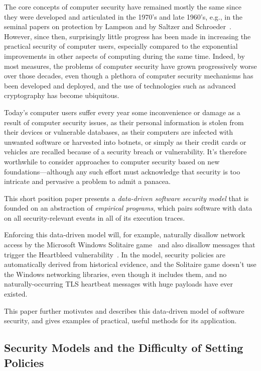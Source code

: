 \documentclass{IEEEtran}
\begin{document}
The core concepts of computer security have remained mostly the same since they were developed and articulated in the 1970’s and late 1960’s, e.g., in the seminal papers on protection by Lampson and by Saltzer and Schroeder~\cite{Protection,SaltzerAndSchroeder}.
However, since then, surprisingly little progress has been made in increasing the practical security of computer users, especially compared to the exponential improvements in other aspects of computing during the same time.
Indeed, by most measures, the problems of computer security have grown progressively worse over those decades, even though a plethora of computer security mechanisms has been developed and deployed, and the use of technologies such as advanced cryptography has become ubiquitous.


Today’s computer users suffer every year some inconvenience or damage as a result of computer security issues, as their personal information is stolen from their devices or vulnerable databases, as their computers are infected with unwanted software or harvested into botnets, or simply as their credit cards or vehicles are recalled because of a security breach or vulnerability.
It’s therefore worthwhile to consider approaches to computer security based on new foundations---although any such effort must acknowledge that security is too intricate and pervasive a problem to admit a panacea. 


This short position paper presents a \emph{data-driven software security model} that is founded on an abstraction of \emph{empirical programs}, which pairs software with data on all security-relevant events in all of its execution traces.


Enforcing this data-driven model will, for example, 
naturally
disallow network access by the Microsoft Windows Solitaire game~\cite{Solitaire}
and also disallow messages that trigger the Heartbleed vulnerability~\cite{Heartbleed}.
In the model, security policies are automatically derived from historical evidence,
and the Solitaire game doesn't use the Windows networking libraries, even though it includes them,
and no naturally-occurring TLS heartbeat messages with huge payloads have ever existed.


This  paper  further motivates  and describes this data-driven model of software security, and gives examples of practical, useful methods for its application.


\subsection{Security Models and the Difficulty of Setting Policies}
\end{document}

